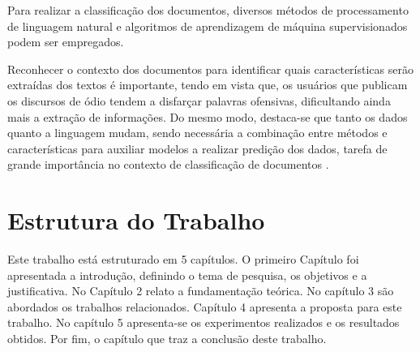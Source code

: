 Para realizar a classificação dos documentos, diversos métodos de processamento de linguagem natural e algoritmos de aprendizagem de máquina supervisionados podem ser empregados. 

Reconhecer o contexto dos documentos para identificar quais características serão extraídas dos textos é importante, tendo em vista que, os usuários que publicam os discursos de ódio tendem a disfarçar palavras ofensivas, dificultando ainda mais a extração de informações. Do mesmo modo, destaca-se que tanto os dados quanto a linguagem mudam, sendo necessária a combinação entre métodos e características para auxiliar modelos a realizar predição dos dados, tarefa de grande importância no contexto de classificação de documentos \cite{nobata2016abusive}. 

\section{Estrutura do Trabalho}

Este trabalho está estruturado em 5 capítulos. O primeiro Capítulo foi apresentada a introdução, definindo o tema de pesquisa, os objetivos e a justificativa. No Capítulo 2 relato a fundamentação teórica. No capítulo 3 são abordados os trabalhos relacionados. Capítulo 4 apresenta a proposta para este trabalho. No capítulo 5 apresenta-se os experimentos realizados e os resultados obtidos. Por fim, o capítulo que traz a conclusão deste trabalho.